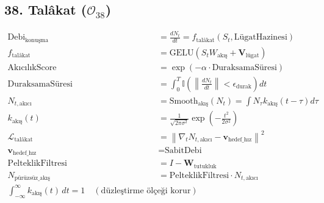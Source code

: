 \documentclass[11pt, a4paper]{article}
\begin{document}
\subsection{38. Talâkat ($\mathcal{O}_{38}$)}
\begin{align}
\text{Debi}_{\text{konuşma}} &= \frac{d N_t}{d t} = f_{\text{talâkat}}(S_t, \text{LügatHazinesi}) \\
f_{\text{talâkat}} &= \text{GELU}(S_t W_{\text{akış}} + \mathbf{V}_{\text{lügat}}) \\
\text{AkıcılıkScore} &= \exp\left( -\alpha \cdot \text{DuraksamaSüresi} \right) \\
\text{DuraksamaSüresi} &= \int_0^T \mathbb{I}\left( \left\|\frac{d N_t}{d t}\right\| < \epsilon_{\text{durak}} \right) dt \\
N_{t, \text{akıcı}} &= \text{Smooth}_{\text{akış}}(N_t) = \int N_\tau k_{\text{akış}}(t-\tau) d\tau \\
k_{\text{akış}}(t) &= \frac{1}{\sqrt{2\pi \sigma^2}} \exp\left( -\frac{t^2}{2\sigma^2} \right) \\
\mathcal{L}_{\text{talâkat}} &= \left\| \nabla_t N_{t, \text{akıcı}} - \mathbf{v}_{\text{hedef\_hız}} \right\|^2 \\
\mathbf{v}_{\text{hedef\_hız}} &= \text{SabitDebi} \\
\text{PelteklikFiltresi} &= I - \mathbf{W}_{\text{tutukluk}} \\
N_{\text{pürüzsüz\_akış}} &= \text{PelteklikFiltresi} \cdot N_{t, \text{akıcı}} \\
\int_{-\infty}^{\infty} k_{\text{akış}}(t) \, dt = 1 \quad (\text{düzleştirme ölçeği korur})
\end{align}
\end{document}
